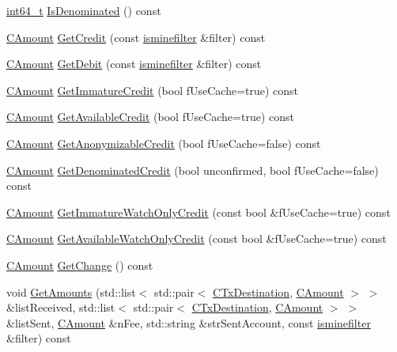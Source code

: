 \begin{DoxyCompactItemize}
\item 
\hyperlink{stdint_8h_adec1df1b8b51cb32b77e5b86fff46471}{int64\+\_\+t} \hyperlink{class_c_wallet_tx_a1ba00949ac5e02d8fa2cacaa5b5b1ade}{Is\+Denominated} () const 
\item 
\hyperlink{amount_8h_a4eaf3a5239714d8c45b851527f7cb564}{C\+Amount} \hyperlink{class_c_wallet_tx_a6712fa5cd5831f4a8828b807852d32d0}{Get\+Credit} (const \hyperlink{script_8h_aaa5e1639d76aef50f70532acc3302c4b}{isminefilter} \&filter) const 
\item 
\hyperlink{amount_8h_a4eaf3a5239714d8c45b851527f7cb564}{C\+Amount} \hyperlink{class_c_wallet_tx_a49633327f5b57c3f253c45b5458501d1}{Get\+Debit} (const \hyperlink{script_8h_aaa5e1639d76aef50f70532acc3302c4b}{isminefilter} \&filter) const 
\item 
\hyperlink{amount_8h_a4eaf3a5239714d8c45b851527f7cb564}{C\+Amount} \hyperlink{class_c_wallet_tx_a7c192ae2f84392150c1157e04913bd76}{Get\+Immature\+Credit} (bool f\+Use\+Cache=true) const 
\item 
\hyperlink{amount_8h_a4eaf3a5239714d8c45b851527f7cb564}{C\+Amount} \hyperlink{class_c_wallet_tx_afc5a3b08c3e48e176e389cf172ae79b7}{Get\+Available\+Credit} (bool f\+Use\+Cache=true) const 
\item 
\hyperlink{amount_8h_a4eaf3a5239714d8c45b851527f7cb564}{C\+Amount} \hyperlink{class_c_wallet_tx_a8bb9ffa6758ee861cd65100242c90882}{Get\+Anonymizable\+Credit} (bool f\+Use\+Cache=false) const 
\item 
\hyperlink{amount_8h_a4eaf3a5239714d8c45b851527f7cb564}{C\+Amount} \hyperlink{class_c_wallet_tx_a766d81241f3fb2d6f5a4d6dbbab0ed41}{Get\+Denominated\+Credit} (bool unconfirmed, bool f\+Use\+Cache=false) const 
\item 
\hyperlink{amount_8h_a4eaf3a5239714d8c45b851527f7cb564}{C\+Amount} \hyperlink{class_c_wallet_tx_af6f81048bbda5a788376e9d965da3030}{Get\+Immature\+Watch\+Only\+Credit} (const bool \&f\+Use\+Cache=true) const 
\item 
\hyperlink{amount_8h_a4eaf3a5239714d8c45b851527f7cb564}{C\+Amount} \hyperlink{class_c_wallet_tx_abfe5cf87f8a2704e526506d9680659c9}{Get\+Available\+Watch\+Only\+Credit} (const bool \&f\+Use\+Cache=true) const 
\item 
\hyperlink{amount_8h_a4eaf3a5239714d8c45b851527f7cb564}{C\+Amount} \hyperlink{class_c_wallet_tx_afbc869129f88b9a5bd33b67ab90b0061}{Get\+Change} () const 
\item 
void \hyperlink{class_c_wallet_tx_af46d43266d668fe7152a086f5446d529}{Get\+Amounts} (std\+::list$<$ std\+::pair$<$ \hyperlink{keystore_8h_a8f46ecba0ddeb036be6b58d6ed1909cd}{C\+Tx\+Destination}, \hyperlink{amount_8h_a4eaf3a5239714d8c45b851527f7cb564}{C\+Amount} $>$ $>$ \&list\+Received, std\+::list$<$ std\+::pair$<$ \hyperlink{keystore_8h_a8f46ecba0ddeb036be6b58d6ed1909cd}{C\+Tx\+Destination}, \hyperlink{amount_8h_a4eaf3a5239714d8c45b851527f7cb564}{C\+Amount} $>$ $>$ \&list\+Sent, \hyperlink{amount_8h_a4eaf3a5239714d8c45b851527f7cb564}{C\+Amount} \&n\+Fee, std\+::string \&str\+Sent\+Account, const \hyperlink{script_8h_aaa5e1639d76aef50f70532acc3302c4b}{isminefilter} \&filter) const 

\end{DoxyCompactItemize}
